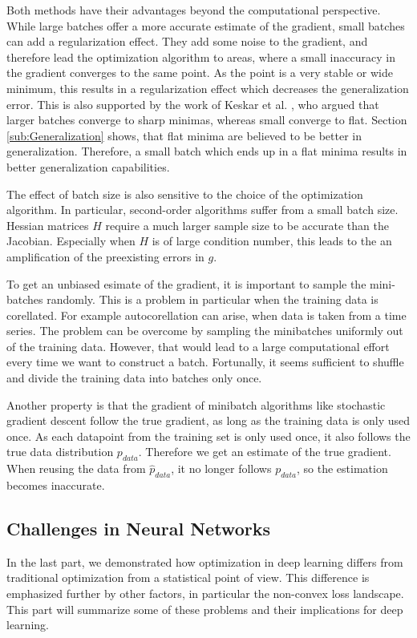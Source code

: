 Both methods have their advantages beyond the computational perspective. While
large batches offer a more accurate estimate of the gradient, small batches can
add a regularization effect. They add some noise to the gradient, and therefore
lead the optimization algorithm to areas, where a small inaccuracy in the
gradient converges to the same point. As the point is a very stable or wide
minimum, this results in a regularization effect which decreases the
generalization error. This is also supported by the work of Keskar et al.
\cite{keskar2016large}, who argued that larger batches converge to sharp
minimas, whereas small converge to flat. Section \ref{sub:Generalization} shows,
that flat minima are believed to be better in generalization. Therefore, a small
batch which ends up in a flat minima results in better generalization
capabilities.


The effect of batch size is also sensitive to the choice of the optimization
algorithm. In particular, second-order algorithms suffer from a small batch
size. Hessian matrices $H$ require a much larger sample size to be accurate than
the Jacobian. Especially when $H$ is of large condition number, this leads to the
an amplification of the preexisting errors in $g$.

To get an unbiased esimate of the gradient, it is important to sample the
mini-batches randomly. This is a problem in particular when the training data is
corellated. For example autocorellation can arise, when data is taken from a
time series. The problem can be overcome by sampling the minibatches uniformly
out of the training data. However, that would lead to a large computational
effort every time we want to construct a batch. Fortunally, it seems sufficient
to shuffle and divide the training data into batches only once.

Another property is that the gradient of minibatch algorithms like stochastic
gradient descent follow the true gradient, as long as the training data is only
used once. As each datapoint from the training set is only used once, it also
follows the true data distribution $p_{data}$. Therefore we get an estimate of
the true gradient. When reusing the data from $\hat{p}_{data}$, it no longer
follows $p_{data}$, so the estimation becomes inaccurate.

\subsection{Challenges in Neural Networks}
In the last part, we demonstrated how optimization in deep learning differs from
traditional optimization from a statistical point of view. This difference is
emphasized further by other factors, in particular the non-convex loss
landscape. This part will summarize some of these problems and their
implications for deep learning.


